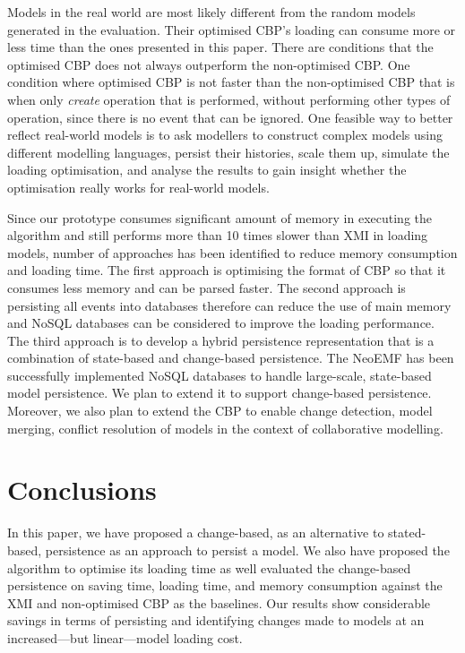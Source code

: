 \documentclass{llncs}
\begin{document}
Models in the real world are most likely different from the random models generated in the evaluation. Their optimised CBP's loading can consume more or less time than the ones presented in this paper. There are conditions that the optimised CBP does not always outperform the non-optimised CBP. One condition where optimised CBP is not faster than the non-optimised CBP that is when only \emph{create} operation that is performed, without performing other types of operation, since there is no event that can be ignored. One feasible way to better reflect real-world models is to ask modellers to construct complex models using different modelling languages, persist their histories, scale them up, simulate the loading optimisation, and analyse the results to gain insight whether the optimisation really works for real-world models. 

Since our prototype consumes significant amount of memory in executing the algorithm and still performs more than 10 times slower than XMI in loading models, number of approaches has been identified to reduce memory consumption and loading time. The first approach is optimising the format of CBP so that it consumes less memory and can be parsed faster. The second approach is persisting all events into databases therefore can reduce the use of main memory and NoSQL databases can be considered to improve the loading performance. The third approach is to develop a hybrid persistence representation that is a combination of state-based and change-based persistence. The NeoEMF \cite{daniel2016neoemf} has been successfully implemented NoSQL databases to handle large-scale, state-based model persistence. We plan to extend it to support change-based persistence. Moreover, we also plan to extend the CBP to enable change detection, model merging, conflict resolution of models in the context of collaborative modelling.

\section{Conclusions}
\label{sec:conclusions}
In this paper, we have proposed a change-based, as an alternative to stated-based, persistence as an approach to persist a model. We also have proposed the algorithm to optimise its loading time as well evaluated the change-based persistence on saving time, loading time, and memory consumption against the XMI and non-optimised CBP as the baselines. Our results show considerable savings in terms of persisting and identifying changes made to models at an increased---but linear---model loading cost. 


 

\end{document}
